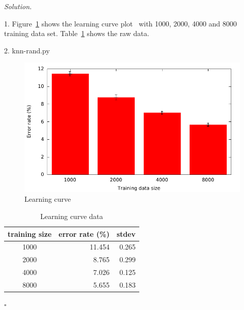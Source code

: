 \documentclass[11pt]{article}
\theoremstyle{definition}
\newenvironment{solution}{\noindent\emph{Solution.}}{\hfill$\square$}
\begin{document}
\begin{solution}

1. Figure~\ref{fig:lc} shows the learning curve plot~\cite{gnuplot-so} with 1000, 2000, 4000 and 8000 training data set. Table~\ref{tbl:lc} shows the raw data.

2. knn-rand.py

\begin {figure}[h]
    \includegraphics{figures/fig1}
	\caption{Learning curve}
	\label{fig:lc}
\end {figure}

\begin{table}[h]
\centering
\begin{tabular}{|c|r|r|}
\hline
\textbf{training size} & \multicolumn{1}{c|}{\textbf{error rate (\%)}} & \multicolumn{1}{c|}{\textbf{stdev}} \\ \hline
1000                   & 11.454                                        & 0.265                               \\ \hline
2000                   & 8.765                                         & 0.299                               \\ \hline
4000                   & 7.026                                         & 0.125                               \\ \hline
8000                   & 5.655                                         & 0.183                               \\ \hline
\end{tabular}
\caption{Learning curve data}
\label{tbl:lc}
\end{table}

\end{solution}

\newpage
\end{document}

